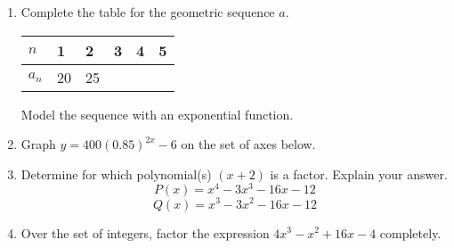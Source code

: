 \documentclass[12pt, twoside]{article}
\begin{document}
\begin{enumerate}[itemsep=0.5cm]
\item Complete the table for the geometric sequence $a$.
    \begin{center}
    \begin{tabular}{|p{1cm}|p{1cm}|p{1cm}|p{1cm}|p{1cm}|p{1cm}|}
        \hline
        $n$ & 1 & 2 & 3 & 4 & 5 \\
        \hline
        $a_n$ & 20 & 25 & & & \\[0.25cm]
        \hline
    \end{tabular}
    \end{center}
    Model the sequence with an exponential function.

\newpage
\item Graph $y=400(0.85)^{2x}-6$ on the set of axes below. %
\begin{center}
    \end{center}

\newpage
\item Determine for which polynomial(s) $(x + 2)$ is a factor. Explain your answer.
 $$P(x) = x^4-3x^3-16x-12$$ 
 $$Q(x) = x^3-3x^2-16x-12$$ \vspace{10cm}

\item Over the set of integers, factor the expression $4x^3 - x^2 + 16x - 4$ completely. %


\end{enumerate}
\end{document}
